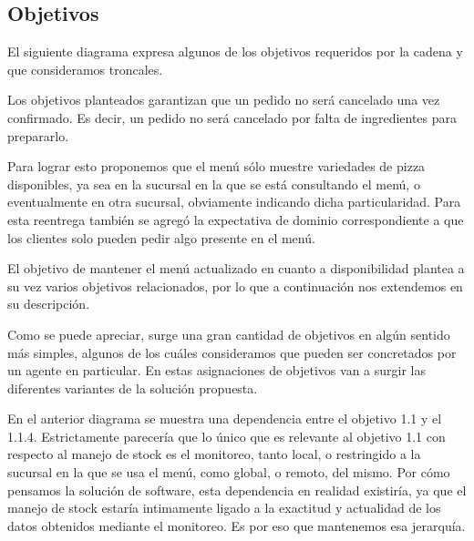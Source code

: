 \documentclass[a4paper,10pt]{article}
\begin{document}

\subsection*{Objetivos}
\noindent

El siguiente diagrama expresa algunos de los objetivos requeridos por la cadena y que consideramos troncales.

\begin{figure}[H]
\centering
{}
\caption{}
\end{figure}

Los objetivos planteados garantizan que un pedido no será cancelado una vez confirmado. Es decir, un pedido no será cancelado por falta de ingredientes para prepararlo. 

Para lograr esto proponemos que el menú sólo muestre variedades de pizza disponibles, ya sea en la sucursal en la que se está consultando el menú, o eventualmente en otra sucursal, obviamente indicando dicha particularidad. Para esta reentrega tambi\'en se agreg\'o la expectativa de dominio correspondiente a que los clientes solo pueden pedir algo presente en el men\'u.

El objetivo de mantener el menú actualizado en cuanto a disponibilidad plantea a su vez varios objetivos relacionados, por lo que a continuación nos extendemos en su descripción.

\begin{figure}[H]
\centering
{}
\caption{}
\end{figure}

Como se puede apreciar, surge una gran cantidad de objetivos en algún sentido más simples, algunos de los cuáles consideramos que pueden ser concretados por un agente en particular. En estas asignaciones de objetivos van a surgir las diferentes variantes de la solución propuesta. 

En el anterior diagrama se muestra una dependencia entre el objetivo 1.1 y el 1.1.4. Estrictamente parecería que lo único que es relevante al objetivo 1.1 con respecto al manejo de stock es el monitoreo, tanto local, o restringido a la sucursal en la que se usa el menú, como global, o remoto, del mismo. Por cómo pensamos la solución de software, esta dependencia en realidad existiría, ya que el manejo de stock estaría intimamente ligado a la exactitud y actualidad de los datos obtenidos mediante el monitoreo. Es por eso que mantenemos esa jerarquía.
\end{document}
